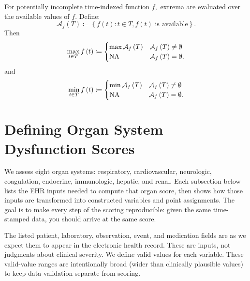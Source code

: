 \documentclass[letterpaper,10pt]{article}
\begin{document}
For potentially incomplete time-indexed function $f,$ extrema are evaluated over
the available values of $f.$ Define:
\begin{equation}
  \label{eq:available-values}
  \mathcal{A}_{f}\left(T\right) \coloneqq \left\{ f \left(t\right) : t \in T, f\left(t\right) \text{ is available}\right\}.
\end{equation}
Then
\begin{equation}
  \label{eq:max-available-values}
  \max_{t \in T} f\left(t\right) \coloneqq
    \begin{cases}
      \max \mathcal{A}_{f}\left(T\right) & \mathcal{A}_{f}\left(T\right) \ne \emptyset \\
      \mathrm{NA} & \mathcal{A}_{f}\left(T\right) = \emptyset,
    \end{cases}
\end{equation}
and
\begin{equation}
  \label{eq:min-available-values}
  \min_{t \in T} f\left(t\right) \coloneqq
    \begin{cases}
      \min \mathcal{A}_{f}\left(T\right) & \mathcal{A}_{f}\left(T\right) \ne \emptyset \\
      \mathrm{NA} & \mathcal{A}_{f}\left(T\right) = \emptyset.
    \end{cases}
\end{equation}

\section{Defining Organ System Dysfunction Scores}\label{sec:defining-organ-system-dysfunction-scores}

We assess eight organ systems: respiratory, cardiovascular, neurologic,
coagulation, endocrine, immunologic, hepatic, and renal. Each subsection below
lists the EHR inputs needed to compute that organ score, then shows how those
inputs are transformed into constructed variables and point assignments. The
goal is to make every step of the scoring reproducible: given the same
time-stamped data, you should arrive at the same score.

The listed patient, laboratory, observation, event, and medication fields are as
we expect them to appear in the electronic health record. These are inputs, not
judgments about clinical severity.  We define valid values for each variable.
These valid-value ranges are intentionally broad (wider than clinically
plausible values) to keep data validation separate from scoring.
\end{document}
